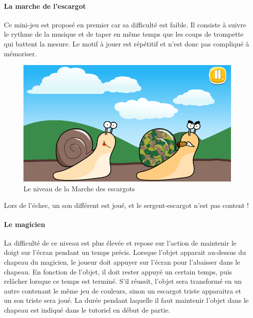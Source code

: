 \paragraph{La marche de l'escargot}

Ce mini-jeu est proposé en premier car sa difficulté est faible. Il consiste à suivre le rythme de la musique et de taper en même temps que les coups de trompette qui battent la mesure. Le motif à jouer est répétitif et n'est donc pas compliqué à mémoriser.

\begin{figure}[H]\centering
  \includegraphics[scale=0.4]{./img/resultat_escargot.png}
  \caption{Le niveau de la Marche des escargots}
  \label{niveau_escargot}
\end{figure}

Lors de l'échec, un son différent est joué, et le sergent-escargot n'est pas content !


\paragraph{Le magicien}

La difficulté de ce niveau est plus élevée et repose sur l'action de maintenir le doigt sur l'écran pendant un temps précis. Lorsque l'objet apparait au-dessus du chapeau du magicien, le joueur doit appuyer sur l'écran pour l'abaisser dans le chapeau. En fonction de l'objet, il doit rester appuyé un certain temps, puis relâcher lorsque ce temps est terminé. S'il réussit, l'objet sera transformé en un autre contenant le même jeu de couleurs, sinon un escargot triste apparaitra et un son triste sera joué. La durée pendant laquelle il faut maintenir l'objet dans le chapeau est indiqué dans le tutoriel en début de partie.

